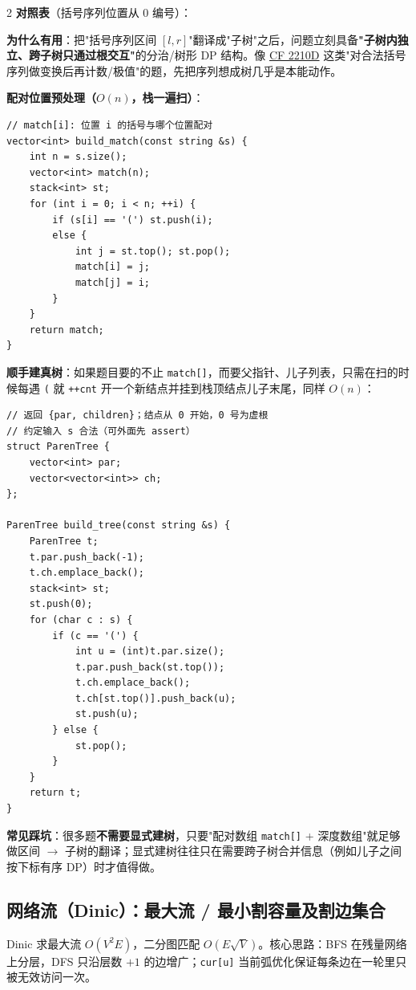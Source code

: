 \begin{multicols*}{2}
		\textbf{对照表}（括号序列位置从 $0$ 编号）：



		\textbf{为什么有用}：把"括号序列区间 $[l, r]$"翻译成"子树"之后，问题立刻具备\textbf{"子树内独立、跨子树只通过根交互"}的分治/树形 DP 结构。像 \href{https://codeforces.com/contest/2210/problem/D}{CF 2210D} 这类"对合法括号序列做变换后再计数/极值"的题，先把序列想成树几乎是本能动作。

		\textbf{配对位置预处理（$O(n)$，栈一遍扫）}：

		\begin{verbatim}
// match[i]: 位置 i 的括号与哪个位置配对
vector<int> build_match(const string &s) {
	int n = s.size();
	vector<int> match(n);
	stack<int> st;
	for (int i = 0; i < n; ++i) {
		if (s[i] == '(') st.push(i);
		else {
			int j = st.top(); st.pop();
			match[i] = j;
			match[j] = i;
		}
	}
	return match;
}
		\end{verbatim}

		\textbf{顺手建真树}：如果题目要的不止 \texttt{match[]}，而要父指针、儿子列表，只需在扫的时候每遇 \texttt{(} 就 \texttt{++cnt} 开一个新结点并挂到栈顶结点儿子末尾，同样 $O(n)$：

		\begin{verbatim}
// 返回 {par, children}；结点从 0 开始，0 号为虚根
// 约定输入 s 合法（可外面先 assert）
struct ParenTree {
	vector<int> par;
	vector<vector<int>> ch;
};

ParenTree build_tree(const string &s) {
	ParenTree t;
	t.par.push_back(-1);
	t.ch.emplace_back();
	stack<int> st;
	st.push(0);
	for (char c : s) {
		if (c == '(') {
			int u = (int)t.par.size();
			t.par.push_back(st.top());
			t.ch.emplace_back();
			t.ch[st.top()].push_back(u);
			st.push(u);
		} else {
			st.pop();
		}
	}
	return t;
}
		\end{verbatim}

		\textbf{常见踩坑}：很多题\textbf{不需要显式建树}，只要"配对数组 \texttt{match[]} + 深度数组"就足够做区间 $\to$ 子树的翻译；显式建树往往只在需要跨子树合并信息（例如儿子之间按下标有序 DP）时才值得做。

		\subsection{网络流（Dinic）：最大流 / 最小割容量及割边集合}

		Dinic 求最大流 $O(V^2 E)$，二分图匹配 $O(E\sqrt{V})$。核心思路：BFS 在残量网络上分层，DFS 只沿层数 $+1$ 的边增广；\texttt{cur[u]} 当前弧优化保证每条边在一轮里只被无效访问一次。


\end{multicols*}
